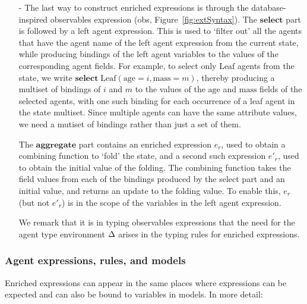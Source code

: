\begin{itemize}
\item[-]
  The last way to construct enriched expressions is through the
  database-inspired observables expression (\textsf{obs},
  Figure~\ref{fig:extSyntax}). The $\mathbf{select}$ part is followed by a left
  agent expression. This is used to `filter out' all the agents that have the
  agent name of the left agent expression from the current state, while
  producing bindings of the left agent variables to the values of the
  corresponding agent fields. For example, to select only $\mathrm{Leaf}$ agents
  from the state, we write
  $\mathbf{select} \; \mathrm{Leaf}(\mathrm{age} = i, \mathrm{mass} = m)$,
  thereby producing a multiset of bindings of $i$ and $m$ to the values of the
  $\mathrm{age}$ and $\mathrm{mass}$ fields of the selected agents, with one
  such binding for each occurrence of a leaf agent in the state multiset.  Since
  multiple agents can have the same attribute values, we need a mutiset of
  bindings rather than just a set of them.

  The $\mathbf{aggregate}$ part contains an enriched expression $e_r$, used to
  obtain a combining function to `fold' the state, and a second such expression
  $e'_r$, used to obtain the initial value of the folding. The combining function
  takes the field values from each of the bindings produced by the select part
  and an initial value, and returns an update to the folding value. To enable
  this, $e_r$ (but not $e'_r$) is in the scope of the variables %
  in the left agent expression.

  We remark that it is in typing observables expressions that the need for the
  agent type environment $\Delta$ arises in the typing rules for enriched
  expressions.

\end{itemize}


\subsubsection*{Agent expressions, rules, and models}
Enriched expressions can appear in the same places where expressions can be
expected and can also be bound to variables in models. In more detail:


